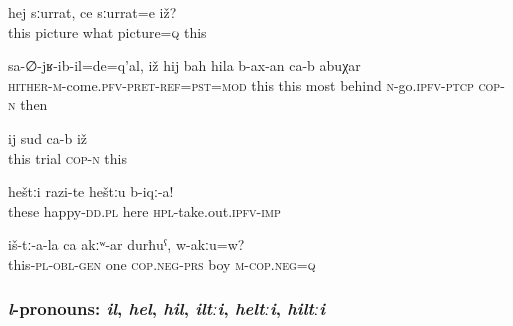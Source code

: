 \begin{exe}
	\ex	\label{This picture, what picture is it/this}
	\gll	hej	sːurrat,	ce	sːurrat=e	iž?\\
		this	picture	what	picture=\textsc{q}	this\\
	\glt	{}

	\ex	\label{This is when he came back; this (iž) then needs to be the (hij) very last}
	\gll	sa-∅-jʁ-ib-il=de=q'al,	iž	hij	bah	hila	b-ax-an ca-b	abuχar\\
		\textsc{hither-m}-come.\textsc{pfv}-\textsc{pret}-\textsc{ref}=\textsc{pst}=\textsc{mod}	this	this	most	behind	\textsc{n}-go.\textsc{ipfv}-\textsc{ptcp} \textsc{cop-n}	then\\
	\glt	{}

	\ex	\label{This (iž) is the (ij) trial}
	\gll	ij	sud	ca-b	iž\\
		this	trial	\textsc{cop-n}	this\\
	\glt {}
	
\ex	\label{These happy ones (=happy people on a picture) give them here!}
	\gll	heštːi	razi-te	heštːu	b-iqː-a! \\
		these	happy-\textsc{dd}\textsc{.pl} 	here	\textsc{hpl}-take.out.\textsc{ipfv}-\textsc{imp}\\
	\glt	{}

	\ex	\label{They have only one son, right?}
	\gll	iš-tː-a-la	ca	akːʷ-ar	durħuˁ,	w-akːu=w?\\
		this-\textsc{pl}-\textsc{obl}-\textsc{gen}	one	\textsc{cop.neg}-\textsc{prs} boy	\textsc{m}-\textsc{cop.neg}=\textsc{q}\\
	\glt	{}


\end{exe}



\subsubsection{\textit{l}-pronouns: \textit{il}, \textit{hel}, \textit{hil}, \textit{iltːi}, \textit{heltːi}, \textit{hiltːi}}
\label{sssec:l-pronouns}

